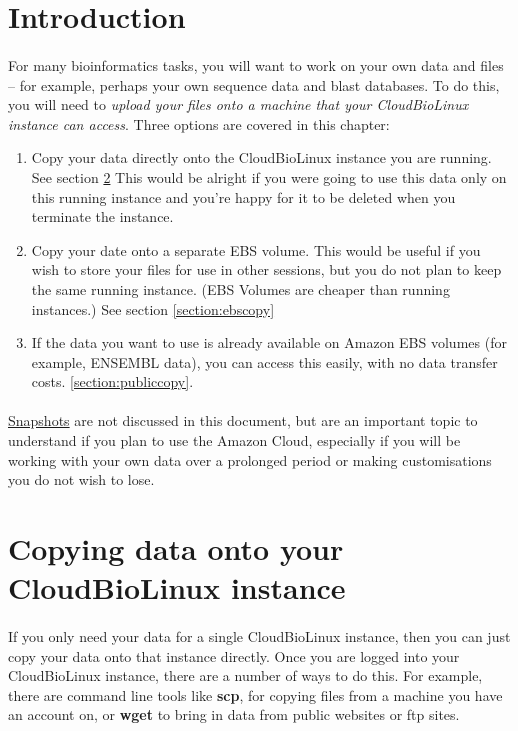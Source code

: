 \section{Introduction}\label{section:data}

\paragraph{}For many bioinformatics tasks, you will want to work on your own data and files – for example, perhaps your own sequence data and blast databases. To do this, you will need to \emph{upload your files onto a machine that your CloudBioLinux instance can access}. Three options are covered in this chapter:
\begin{enumerate}
\item Copy your data directly onto the CloudBioLinux instance you are running. See section \ref{section:directcopy} This would be alright if you were going to use this data only on this running instance and you're happy for it to be deleted when you terminate the instance.
\item Copy your date onto a separate EBS volume. This would be useful if you wish to store your files for use in other sessions, but you do not plan to keep the same running instance. (EBS Volumes are cheaper than running instances.) See section \ref{section:ebscopy}
\item If the data you want to use is already available on Amazon EBS volumes (for example, ENSEMBL data), you can access this easily, with no data transfer costs.  \ref{section:publiccopy}. 
\end{enumerate}

\paragraph{}\href{http://docs.amazonwebservices.com/AWSEC2/latest/UserGuide/creating-snapshot-ebs.html}{Snapshots} are not discussed in this document, but are an important topic to understand if you plan to use the Amazon Cloud, especially if you will be working with your own data over a prolonged period or making customisations you do not wish to lose. 

\section{Copying data onto your CloudBioLinux instance}
\label{section:directcopy}
\paragraph{}If you only need your data for a single CloudBioLinux instance, then you can just copy your data onto that instance directly. Once you are logged into your CloudBioLinux instance, there are a number of ways to do this. For example, there are command line tools like \textbf{scp}, for copying files from a machine you have an account on, or \textbf{wget} to bring in data from public websites or ftp sites. 

